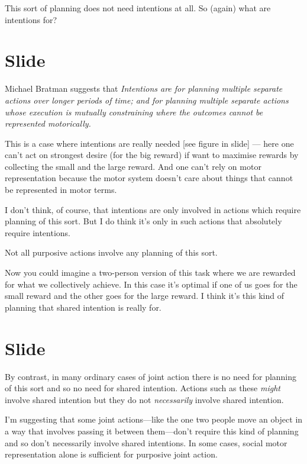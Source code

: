 \documentclass[12pt,\papersize]{extarticle}
\begin{document}
This sort of planning does not need intentions at all.  So (again) what are intentions for?



\section{Slide}
Michael Bratman suggests that 
\emph{Intentions are for planning multiple separate actions over longer periods of time; and for planning multiple separate actions whose execution is mutually constraining where the outcomes cannot be represented motorically.}

This is a case where intentions are really needed [see figure in slide] --- here one can’t act on strongest desire (for the big reward) if want to maximise rewards by collecting the small and the large reward.
And one can’t rely on motor representation because the motor system doesn’t care about things that cannot be represented in motor terms.

I don't think, of course, that intentions are only involved in actions which require planning of this sort.
But I do think it's only in such actions that absolutely require intentions.

Not all purposive actions involve any planning of this sort. 

Now you could imagine a two-person version of this task where we are rewarded for what we collectively achieve.  In this case it’s optimal if one of us goes for the small reward and the other goes for the large reward.  I think it’s this kind of planning that shared intention is really for.



\section{Slide}
By contrast, in many ordinary cases of joint action there is no need for planning of this sort and so no need for shared intention.  Actions such as these \emph{might} involve shared intention but they do not \emph{necessarily} involve shared intention.

I’m suggesting that some joint actions---like the one two people move an object in a way that involves passing it between them---don’t require this kind of planning and so don’t necessarily involve shared intentions.
In some cases, social motor representation alone is sufficient for purposive joint action.
\end{document}
